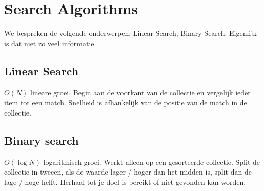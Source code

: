 \section{Search Algorithms}
We bespreken de volgende onderwerpen: Linear Search, Binary Search.
Eigenlijk is dat niet zo veel informatie.

\subsection{Linear Search}
$O(N)$ lineare groei.
Begin aan de voorkant van de collectie en vergelijk ieder item tot een match.
Snelheid is afhankelijk van de positie van de match in de collectie.

\subsection{Binary search}
$O(\log N)$ logaritmisch groei.
Werkt alleen op een gesorteerde collectie.
Split de collectie in tweeën, als de waarde lager / hoger dan het midden is, split dan de lage / hoge helft.
Herhaal tot je doel is bereikt of niet gevonden kan worden.
